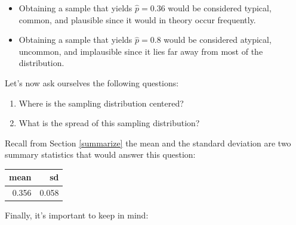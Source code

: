 \documentclass[12pt,]{krantz}
\makeatletter
\newenvironment{Shaded}{\begin{snugshade}}{\end{snugshade}}
\newcommand{\KeywordTok}[1]{\textcolor[rgb]{0.27,0.27,0.27}{\textbf{#1}}}
\newcommand{\DataTypeTok}[1]{\textcolor[rgb]{0.27,0.27,0.27}{#1}}
\newcommand{\StringTok}[1]{\textcolor[rgb]{0.5,0.5,0.5}{#1}}
\newcommand{\OperatorTok}[1]{\textcolor[rgb]{0.43,0.43,0.43}{\textbf{#1}}}
\newcommand{\NormalTok}[1]{#1}
\providecommand{\tightlist}{%
  \setlength{\itemsep}{0pt}\setlength{\parskip}{0pt}}
\newenvironment{kframe}{%
\medskip{}
\setlength{\fboxsep}{.8em}
 \def\at@end@of@kframe{}%
 \ifinner\ifhmode%
  \def\at@end@of@kframe{\end{minipage}}%
  \begin{minipage}{\columnwidth}%
 \fi\fi%
 \def\FrameCommand##1{\hskip\@totalleftmargin \hskip-\fboxsep
 \colorbox{shadecolor}{##1}\hskip-\fboxsep
     \hskip-\linewidth \hskip-\@totalleftmargin \hskip\columnwidth}%
 \MakeFramed {\advance\hsize-\width
   \@totalleftmargin\z@ \linewidth\hsize
   \@setminipage}}%
 {\par\unskip\endMakeFramed%
 \at@end@of@kframe}
\renewenvironment{Shaded}{\begin{kframe}}{\end{kframe}}
\theoremstyle{definition}
\theoremstyle{definition}
\theoremstyle{definition}
\theoremstyle{remark}
\makeatother
\begin{document}
\begin{itemize}
\tightlist
\item
  Obtaining a sample that yields \(\widehat{p} = 0.36\) would be
  considered typical, common, and plausible since it would in theory
  occur frequently.
\item
  Obtaining a sample that yields \(\widehat{p} = 0.8\) would be
  considered atypical, uncommon, and implausible since it lies far away
  from most of the distribution.
\end{itemize}

Let's now ask ourselves the following questions:

\begin{enumerate}
\def\labelenumi{\arabic{enumi}.}
\tightlist
\item
  Where is the sampling distribution centered?
\item
  What is the spread of this sampling distribution?
\end{enumerate}

Recall from Section \ref{summarize} the mean and the standard deviation
are two summary statistics that would answer this question:

\begin{Shaded}
\end{Shaded}

\begin{table}[H]
\centering\begingroup\fontsize{10}{12}\selectfont

\begin{tabular}{r|r}
\hline
mean & sd\\
\hline
0.356 & 0.058\\
\hline
\end{tabular}
\endgroup{}
\end{table}

Finally, it's important to keep in mind:
\end{document}
